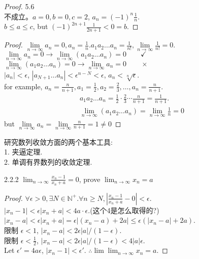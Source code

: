\begin{proof}5.6\\
	不成立。$ a=0,b=0,c=2 $, $ a_n = (-1)^n\frac{1}{n} $.\\
	$ b\leqslant a\leqslant c $, but $ (-1)^{2n+1}\frac{1}{2n+1}<0=b $.
\end{proof}
\begin{proof}
	$ \lim\limits_{n\rightarrow\infty}a_n=0, a_n = \frac{1}{n} $.$ a_1a_2\dots a_n = \frac{1}{n!}, \lim\limits_{n\rightarrow\infty}\frac{1}{n!}=0 $.\\
	$ \lim\limits_{n\rightarrow\infty}a_n=0 \rightarrow \lim\limits_{n\rightarrow\infty}(a_1a_2\dots a_n)=0 \qquad\checkmark$\\
	$ \lim\limits_{n\rightarrow\infty}(a_1a_2\dots a_n)=0 \rightarrow \lim\limits_{n\rightarrow\infty}a_n=0 \qquad\times$\\
	$ |a_n|<\epsilon $, $ |a_{N+1}\dots a_n|<\epsilon^{n-N}<\epsilon $,	$ a_n <\sqrt[n]{\epsilon} $.\\
	for example, $ a_n = \frac{n}{n+1}, a_1 = \frac{1}{2}, a_2=\frac{2}{3},\dots,a_n=\frac{n}{n+1} $.\\
	\begin{align*}
	 a_1a_2\dots a_n = \frac{1}{2}\cdot\frac{2}{3}\cdots\frac{n}{n+1} = \frac{1}{n+1} . \\
	\lim\limits_{n\rightarrow\infty}
	(a_1a_2\dots a_n) =  
	\lim\limits_{n\rightarrow\infty}
	\frac{1}{n}
	=0
	\end{align*}	
but $ 	\lim\limits_{n\rightarrow\infty}a_n=	\lim\limits_{n\rightarrow\infty}
\frac{n}{n+1} = 1 \neq 0  $
\end{proof}

研究数列收敛方面的两个基本工具:\\
1. 夹逼定理.\\
2. 单调有界数列的收敛定理.

\begin{example}2.2.2
	$ \lim_{n\rightarrow\infty}\frac{x_n-1}{x_n+a} = 0 $, prove $ \lim_{n\rightarrow\infty}x_n=a $
\end{example}
\begin{proof}
	$\forall \epsilon >0, \exists N \in \mathbb{N}^+. \forall n \geqslant N, |\frac{x_n-1}{x_n+a}- 0| < \epsilon$.\\
	$ |{x_n-1}|< \epsilon|{x_n+a}| < 4a\cdot \epsilon $.(这个4是怎么取得的?)\\
	$ |x_n-a|<\epsilon|x_n+a| = \epsilon|(x_n-a)+2a|\leqslant \epsilon(|x_n-a|+2a) $.\\
	限制 $ \epsilon<1 $, $ |x_n-a|<2\epsilon|a|/(1-\epsilon) $.\\
	限制 $ \epsilon<\frac{1}{2} $, $ |x_n-a|<2\epsilon|a|/(1-\epsilon)<4|a|\epsilon $.\\
	Let $ \epsilon'=4a\epsilon  $, $ |{x_n-1}|<\epsilon' $. $ \therefore \lim\lim_{n\rightarrow\infty}x_n = a $.	
\end{proof}

